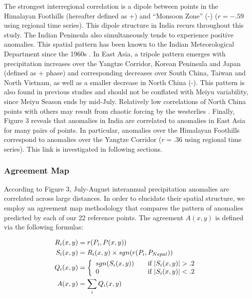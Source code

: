 \documentclass[12pt]{article}
\begin{document}
	 The strongest interregional correlation is a dipole between points in the Himalayan Foothills (hereafter defined as +) and ``Monsoon Zone'' (-) ($r=-.59$ using regional time series). This dipole structure in India recurs throughout this study. The Indian Peninsula also simultaneously tends to experience positive anomalies. This spatial pattern has been known to the Indian Meteorological Department since the 1960s \citep{Krishnamurthy2000}. In East Asia, a tripole pattern emerges with precipitation increases over the Yangtze Corridor, Korean Peninsula and Japan (defined as + phase) and corresponding decreases over South China, Taiwan and North Vietnam, as well as a smaller decrease in North China (-). This pattern is also found in previous studies \citep{Ding2008} and should not be conflated with Meiyu variability, since Meiyu Season ends by mid-July. Relatively low correlations of North China points with others may result from chaotic forcing by the westerlies \citep{Kosaka2012}. Finally, Figure 3 reveals that anomalies in India are correlated to anomalies in East Asia for many pairs of points. In particular, anomalies over the Himalayan Foothills correspond to anomalies over the Yangtze Corridor ($r=.36$ using regional time series). This link is investigated in following sections.
		
\subsubsection{Agreement Map}

	According to Figure 3, July-August interannual precipitation anomalies are correlated across large distances. In order to elucidate their spatial structure, we employ an agreement map methodology that compares the pattern of anomalies predicted by each of our 22 reference points. The agreement $A(x,y)$ is defined via the following formulas:
	
	\begin{align*}
	R_i(x,y)& = r(P_i,P(x,y)) \\
	S_i(x,y)& = R_i(x,y) \times sgn(r(P_i,P_{Nepal})) \\
	Q_i(x,y)& = \left\{
		\begin{array}{l l}
	 		sgn(S_i(x,y)) & \quad \text{if $|S_i(x,y)|>.2$} \\
	 		0 & \quad \text{if $|S_i(x,y)|<.2$}
	 	\end{array} \right. \\
	A(x,y)& = \sum_{i}Q_i(x,y)
	\end{align*}	
\end{document}
